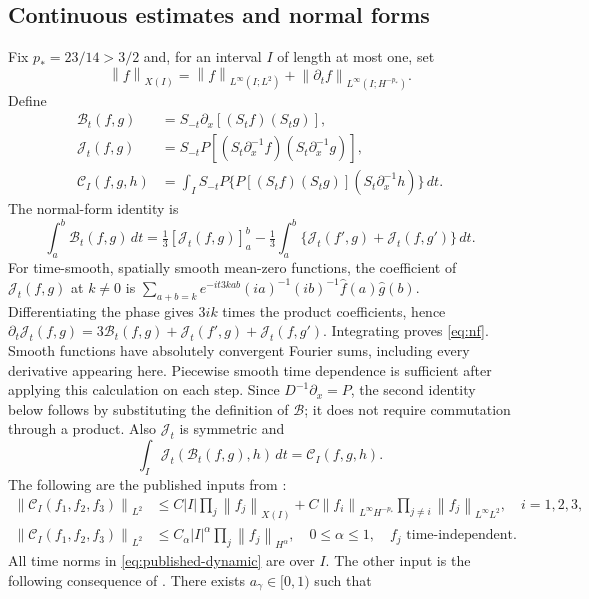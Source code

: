 \documentclass[11pt]{article}
\theoremstyle{remark}\newtheorem{remark}[theorem]{Remark}
\newcommand{\cC}{\mathcal C}
\newcommand{\cJ}{\mathcal J}
\newcommand{\cB}{\mathcal B}
\newcommand{\norm}[2][]{\left\lVert #2\right\rVert_{#1}}
\newcommand{\ip}{\partial_x^{-1}}
\begin{document}
\subsection{Continuous estimates and normal forms}
Fix $p_*=23/14>3/2$ and, for an interval $I$ of length at most one, set
\[
\norm[X(I)]{f}=\norm[L^\infty(I;L^2)]{f}
+\norm[L^\infty(I;H^{-p_*})]{\partial_tf}.
\]
Define
\begin{align*}
\cB_t(f,g)&=S_{-t}\partial_x[(S_tf)(S_tg)],\\
\cJ_t(f,g)&=S_{-t}P[(S_t\ip f)(S_t\ip g)],\\
\cC_I(f,g,h)&=\int_I S_{-t}P\{P[(S_tf)(S_tg)](S_t\ip h)\}\,dt.
\end{align*}
The normal-form identity is
\begin{equation}\label{eq:nf}
\int_a^b\cB_t(f,g)\,dt
=\tfrac13[\cJ_t(f,g)]_a^b
-\tfrac13\int_a^b\{\cJ_t(f',g)+\cJ_t(f,g')\}\,dt.
\end{equation}
For time-smooth, spatially smooth mean-zero functions, the coefficient of
$\cJ_t(f,g)$ at $k\ne0$ is
$\sum_{a+b=k}e^{-it3kab}(ia)^{-1}(ib)^{-1}\widehat f(a)\widehat g(b)$.
Differentiating the phase gives $3ik$ times the product coefficients, hence
$\partial_t\cJ_t(f,g)=3\cB_t(f,g)+\cJ_t(f',g)+\cJ_t(f,g')$.
Integrating proves \eqref{eq:nf}. Smooth functions have absolutely convergent
Fourier sums, including every derivative appearing here. Piecewise smooth
time dependence is sufficient after applying this calculation on each step.
Since $D^{-1}\partial_x=P$, the second identity below follows by substituting
the definition of $\cB$; it does not require commutation through a product.
Also $\cJ_t$ is symmetric and
\begin{equation}\label{eq:CJ}
\int_I\cJ_t(\cB_t(f,g),h)\,dt=\cC_I(f,g,h).
\end{equation}
The following are the published inputs from \cite[Proposition~3.4]{LW}:
\begin{align}
\norm[L^2]{\cC_I(f_1,f_2,f_3)}
&\leq C|I|\prod_j\norm[X(I)]{f_j}
 +C\norm[L^\infty H^{-p_*}]{f_i}\prod_{j\ne i}\norm[L^\infty L^2]{f_j},
\quad i=1,2,3,\label{eq:published-dynamic}\\
\norm[L^2]{\cC_I(f_1,f_2,f_3)}
&\leq C_\alpha |I|^\alpha\prod_j\norm[H^\alpha]{f_j},
\quad 0\leq\alpha\leq1,\quad f_j\text{ time-independent}.\label{eq:published-frozen}
\end{align}
All time norms in \eqref{eq:published-dynamic} are over $I$.
The other input is the following consequence of \cite[Lemma~7.2 and Eq.~(2.2)]{LW}.
There exists $a_\gamma\in[0,1)$ such that
\end{document}
